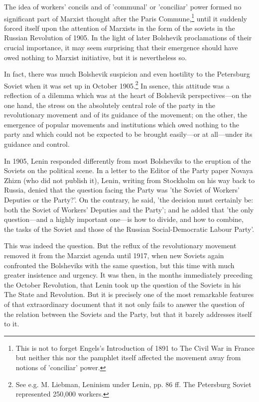 The idea of workers' concils and of 'communal' or 'conciliar' power formed no significant part of Marxist thought after the Paris Commune,\footnote{This is not to forget Engels's Introduction of 1891 to The Civil War in France but neither this nor the pamphlet itself affected the movement away from notions of 'conciliar' power.} until it suddenly forced itself upon the attention of Marxists in the form of the soviets in the Russian Revolution of 1905. In the light of later Bolshevik proclamations of their crucial importance, it may seem surprising that their emergence should have owed nothing to Marxist initiative, but it is nevertheless so.

In fact, there was much Bolshevik suspicion and even hostility to the Petersburg Soviet when it was set up in October 1905.\footnote{See e.g. M. Liebman, Leninism under Lenin, pp. 86 ff. The Petersburg Soviet represented 250,000 workers.} In ssence, this attitude was a reflection of a dilemma which was at the heart of Bolshevik perspectives—on the one hand, the stress on the absolutely central role of the party in the revolutionary movement and of its guidance of the movement; on the other, the emergence of popular movements and institutions which owed nothing to the party and which could not be expected to be brought easily—or at all—under its guidance and control.

In 1905, Lenin responded differently from most Bolsheviks to the eruption of the Soviets on the political scene. In a letter to the Editor of the Party paper Novaya Zhizn (who did not publish it), Lenin, writing from Stockholm on his way back to Russia, denied that the question facing the Party was 'the Soviet of Workers' Deputies or the Party?'. On the contrary, he said, 'the decision must certainly be: both the Soviet of Workers' Deputies and the Party'; and he added that 'the only question—and a highly important one—is how to divide, and how to combine, the tasks of the Soviet and those of the Russian Social\hyp{}Democratic Labour Party'.

This was indeed the question. But the reflux of the revolutionary movement removed it from the Marxist agenda until 1917, when new Soviets again confronted the Bolsheviks with the same question, but this time with much greater insistence and urgency. It was then, in the months immediately preceding the October Revolution, that Lenin took up the question of the Soviets in his The State and Revolution. But it is precisely one of the most remarkable features of that extraordinary document that it not only fails to answer the question of the relation between the Soviets and the Party, but that it barely addresses itself to it.

